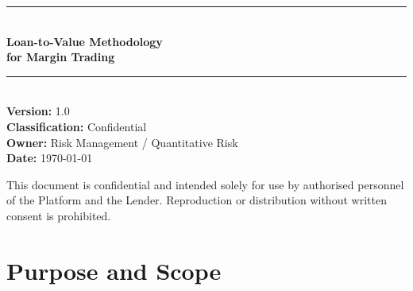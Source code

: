 \documentclass[12pt, a4paper]{article}
\newcommand{\1}{\mathbbm{1}}
\begin{document}
\begin{titlepage}
    \centering
    \vspace*{2cm}
    {\color{darkblue}\rule{\linewidth}{1.5pt}}\\[0.4cm]
    {\Huge\bfseries\color{darkblue} Loan-to-Value Methodology\\[0.3cm]
    for Margin Trading}\\[0.4cm]
    {\color{darkblue}\rule{\linewidth}{1.5pt}}\\[2cm]

    {\large\textbf{Version:} 1.0}\\[0.3cm]
    {\large\textbf{Classification:} Confidential}\\[0.3cm]
    {\large\textbf{Owner:} Risk Management / Quantitative Risk}\\[0.3cm]
    {\large\textbf{Date:} \today}\\[3cm]

    \begin{abstract}
    \noindent
    This document defines the quantitative methodology governing the calculation,
    monitoring, and enforcement of Loan-to-Value (LTV) ratios within the margin
    trading product. It serves as the contractual and operational reference between
    the Platform and the external Lender, covering collateral eligibility, haircut
    derivation, LTV computation, threshold calibration, dynamic regime adjustment,
    margin call procedures, forced liquidation logic, stress testing, and governance.
    The framework is designed to be mathematically rigorous, operationally
    transparent, and aligned with applicable regulatory standards (MiFID~II,
    CRR~II, ESMA leverage guidelines).
    \end{abstract}

    \vfill
    {\small\color{gray} This document is confidential and intended solely for use
    by authorised personnel of the Platform and the Lender. Reproduction or
    distribution without written consent is prohibited.}
\end{titlepage}

\tableofcontents
\newpage

\section{Purpose and Scope}
\label{sec:scope}
\end{document}
